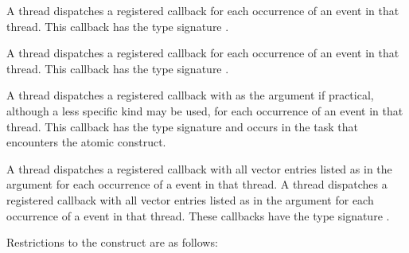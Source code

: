 \tools

A thread dispatches a registered  callback 
for each occurrence of an  event in that thread. This 
callback has the type signature .

A thread dispatches a registered  callback 
for each occurrence of an  event in that thread. This 
callback has the type signature .

A thread dispatches a registered  callback 
with  as the  argument if practical, although 
a less specific kind may be used, for each occurrence of an  
event in that thread. This callback has the type signature 
 and occurs in the task that encounters the atomic 
construct.

A thread dispatches a registered  callback 
with all vector entries listed as  in the 
 argument for each occurrence of a  event in 
that thread. A thread dispatches a registered  
callback with all vector entries listed as  
in the  argument for each occurrence of a  event 
in that thread. These callbacks have the type signature 
.

\restrictions
Restrictions to the  construct are as follows:

